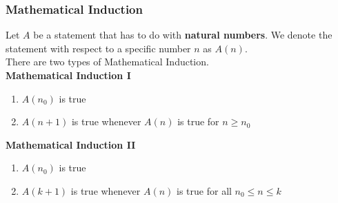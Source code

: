 \documentclass{beamer}
\begin{document}
\begin{frame}
    \frametitle{Mathematical Induction}
\hspace{1em} Let $A$ be a statement that has to do with \textbf{natural numbers}. We denote 
the statement with respect to a specific number $n$ as $A(n)$. \\
\vspace{1em}
There are two types of Mathematical Induction.\\
\vspace{1em}
\textbf{Mathematical Induction I}
\begin{enumerate}
    \item $A(n_0)$ is true
    \item $A(n+1)$ is true whenever $A(n)$ is true for $n \geq n_0$
\end{enumerate}
\vspace{1em}
\textbf{Mathematical Induction II}
\begin{enumerate}
    \item $A(n_0)$ is true
    \item $A(k+1)$ is true whenever $A(n)$ is true for all $n_0\leq n\leq k$
\end{enumerate}
\end{frame}
\end{document}
